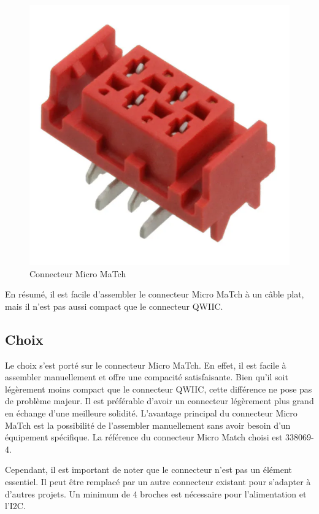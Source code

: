 \begin{figure}[H]
    \centering
    \includegraphics[scale=0.08]{./assets/figures/micromatch.png}
    \caption{\cite{micromatch} Connecteur Micro MaTch}
\end{figure}

En résumé, il est facile d'assembler le connecteur Micro MaTch à un câble plat, mais il n'est pas aussi compact que le connecteur QWIIC.

\subsection{Choix}

Le choix s'est porté sur le connecteur Micro MaTch.
En effet, il est facile à assembler manuellement et offre une compacité satisfaisante.
Bien qu'il soit légèrement moins compact que le connecteur QWIIC, cette différence ne pose pas de problème majeur.
Il est préférable d'avoir un connecteur légèrement plus grand en échange d'une meilleure solidité.
L'avantage principal du connecteur Micro MaTch est la possibilité de l'assembler manuellement sans avoir besoin d'un équipement spécifique.
La référence du connecteur Micro Match choisi est 338069-4.

Cependant, il est important de noter que le connecteur n'est pas un élément essentiel. Il peut être remplacé par un autre connecteur existant pour s'adapter à d'autres projets. Un minimum de 4 broches est nécessaire pour l'alimentation et l'I2C.

